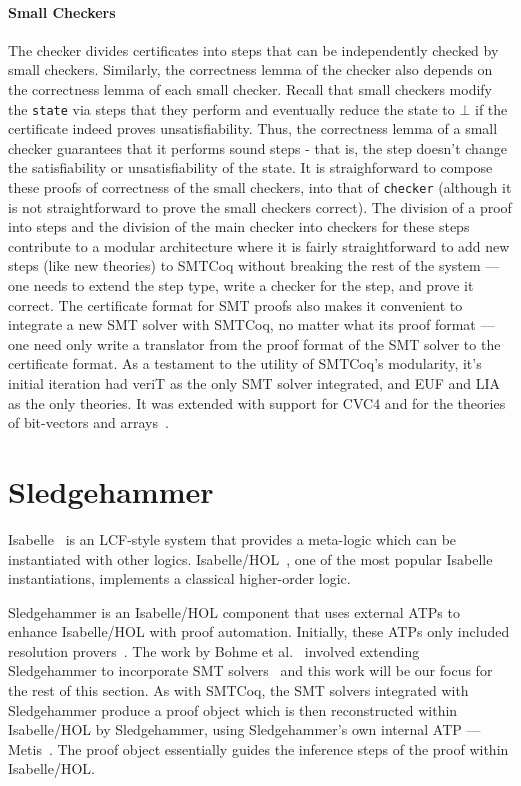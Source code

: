 \documentclass{article}
\begin{document}
	\paragraph{Small Checkers}
	The checker divides certificates
	into steps that can be independently 
	checked by small checkers.
	Similarly, the correctness lemma
	of the checker also depends on 
	the correctness lemma of each 
	small checker. Recall that 
	small checkers modify the 
	\texttt{state} via steps that 
	they perform and eventually
	reduce the state to $\bot$ if 
	the certificate indeed proves
	unsatisfiability.  Thus, the 
	correctness lemma of a small 
	checker guarantees that it
	performs sound steps - that is,
	the step doesn't change the 
	satisfiability or unsatisfiability
	of the state. It is straighforward
	to compose these proofs 
	of correctness of the small 
	checkers, into that of
	\texttt{checker} (although
	it is not straightforward 
	to prove the small checkers 
	correct). The division 
	of a proof into steps and 
	the division of the main 
	checker into checkers for these
	steps contribute to a 
	modular architecture where it 
	is fairly straightforward to 
	add new steps (like new theories)
	to SMTCoq without breaking 
	the rest of the system --- one 
	needs to extend the step type,
	write a checker for the step, 
	and prove it correct. The 
	certificate format for SMT
	proofs also makes it 
	convenient to integrate a 
	new SMT solver with SMTCoq, 
	no matter what its proof format
	--- one need only write a translator
	from the proof format of the SMT
	solver to the certificate format. 
	As a testament to the utility of
	SMTCoq's modularity, it's 
	initial iteration had veriT as 
	the only SMT solver integrated, 
	and EUF and LIA as the only 
	theories. It was extended 
	with support for CVC4 and 
	for the theories of 
	bit-vectors and 
	arrays~\cite{DBLP:journals/corr/EkiciKKMRT16}.
	
	
	\section{Sledgehammer}
	\label{sec:hammer}
	Isabelle~\cite{DBLP:journals/corr/cs-LO-9301106} 
	is an LCF-style system that 
	provides a meta-logic which can be 
	instantiated with other logics.
	Isabelle/HOL~\cite{10.5555/1791547}, 
	one of the most popular Isabelle 
	instantiations, implements a 
	classical higher-order logic. 
	
	Sledgehammer is
	an Isabelle/HOL component that 
	uses external ATPs to enhance 
	Isabelle/HOL with proof 
	automation. Initially, these 
	ATPs only included resolution 
	provers~\cite{10.1007/978-3-642-39799-8_1}.
	The work by Bohme et 
	al.~\cite{bohme} involved 
	extending Sledgehammer to 
	incorporate SMT
	solvers~\cite{Barrett2018} and this 
	work will be our focus for the 
	rest of this section. As with 
	SMTCoq, the SMT solvers integrated
	with Sledgehammer produce a 
	proof object which is 
	then reconstructed within
	Isabelle/HOL by Sledgehammer, 
	using Sledgehammer's own internal 
	ATP --- Metis~\cite{hurd2003d}. The 
	proof object essentially guides 
	the inference steps of the proof 
	within Isabelle/HOL.
	
\end{document}
